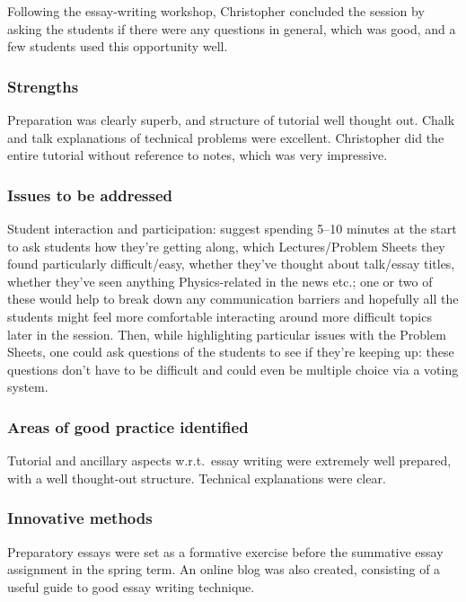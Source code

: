 Following the essay-writing workshop, Christopher concluded the session by asking the students if there were any questions in general, which was good, and a few students used this opportunity well.

\subsubsection{Strengths}

Preparation was clearly superb, and structure of tutorial well thought out. Chalk and talk explanations of technical problems were excellent. Christopher did the entire tutorial without reference to notes, which was very impressive.

\subsubsection{Issues to be addressed}\label{sec:B-issues}

Student interaction and participation: suggest spending 5--10 minutes at the start to ask students how they're getting along, which Lectures/Problem Sheets they found particularly difficult/easy, whether they've thought about talk/essay titles, whether they've seen anything Physics-related in the news etc.; one or two of these would help to break down any communication barriers and hopefully all the students might feel more comfortable interacting around more difficult topics later in the session. Then, while highlighting particular issues with the Problem Sheets, one could ask questions of the students to see if they're keeping up: these questions don't have to be difficult and could even be multiple choice via a voting system.

\subsubsection{Areas of good practice identified}

Tutorial and ancillary aspects w.r.t.\ essay writing were extremely well prepared, with a well thought-out structure. Technical explanations were clear.

\subsubsection{Innovative methods}

Preparatory essays were set as a formative exercise before the summative essay assignment in the spring term. An online blog was also created, consisting of a useful guide to good essay writing technique.

